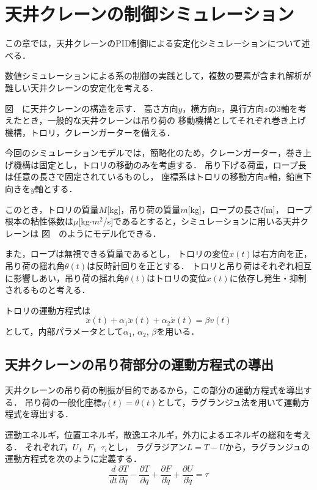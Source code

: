 \documentclass[dvipdfmx,titlepage,a4j]{jsarticle}  %
\begin{document}
\section{天井クレーンの制御シミュレーション}
この章では，天井クレーンのPID制御による安定化シミュレーションについて述べる．

数値シミュレーションによる系の制御の実践として，複数の要素が含まれ解析が難しい天井クレーンの安定化を考える．

図　に天井クレーンの構造を示す．
高さ方向$y$，横方向$x$，奥行方向$z$の3軸を考えたとき，一般的な天井クレーンは吊り荷の
移動機構としてそれぞれ巻き上げ機構，トロリ，クレーンガーターを備える．

今回のシミュレーションモデルでは，簡略化のため，クレーンガーター，巻き上げ機構は固定とし，トロリの移動のみを考慮する．
吊り下げる荷重，ロープ長は任意の長さで固定されているものし，
座標系はトロリの移動方向$x$軸，鉛直下向きを$y$軸とする．

このとき，トロリの質量$M$[kg]，吊り荷の質量$m$[kg]，ロープの長さ$l$[m]，
ロープ根本の粘性係数は$\mu$[kg$\cdot m^2$/s]であるとすると，シミュレーションに用いる天井クレーンは
図　のようにモデル化できる．

また，ロープは無視できる質量であるとし，
トロリの変位$x(t)$は右方向を正，吊り荷の揺れ角$\theta(t)$は反時計回りを正とする．
トロリと吊り荷はそれぞれ相互に影響しあい，吊り荷の揺れ角$\theta(t)$はトロリの変位$x(t)$に依存し発生・抑制されるものと考える．

トロリの運動方程式は
\begin{equation}
  \ddot x(t) + \alpha_1 \ddot x(t)+ \alpha_2 \dot x(t) = \beta v(t) \nonumber
\end{equation}
として，内部パラメータとして$\alpha_1$, $\alpha_2$, $\beta$を用いる．

\subsection{天井クレーンの吊り荷部分の運動方程式の導出}
天井クレーンの吊り荷の制振が目的であるから，この部分の運動方程式を導出する．
吊り荷の一般化座標$q(t) = \theta(t)$として，ラグランジュ法を用いて運動方程式を導出する．

運動エネルギ，位置エネルギ，散逸エネルギ，外力によるエネルギの総和を考える．
それぞれ$T$，$U$，$F$，$\tau_i$とし，
ラグラジアン$L = T - U$から，ラグランジュの運動方程式を次のように定義する．
\begin{equation}
  \frac{d}{dt} \frac{\partial T}{\partial \dot{q}} - \frac{\partial T}{\partial q} + \frac{\partial F}{\partial \dot q} + \frac{\partial U}{\partial \dot q} = \tau \nonumber
\end{equation}
\end{document}
